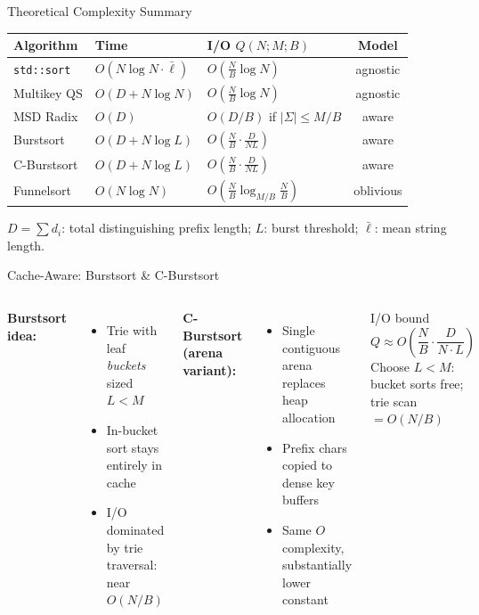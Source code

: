 \documentclass[aspectratio=169]{beamer}
\begin{document}
\begin{frame}{Theoretical Complexity Summary}
  \footnotesize
  \begin{tabular}{@{}lllc@{}}
    \toprule
    Algorithm & Time & I/O $Q(N;M;B)$ & Model \\
    \midrule
    \texttt{std::sort} & $O(N\log N\cdot\bar\ell)$
      & $O\!\left(\tfrac{N}{B}\log N\right)$ & agnostic \\
    Multikey QS & $O(D+N\log N)$
      & $O\!\left(\tfrac{N}{B}\log N\right)$ & agnostic \\
    MSD Radix & $O(D)$
      & $O(D/B)$ if $|\Sigma|\le M/B$ & aware \\
    Burstsort & $O(D+N\log L)$
      & $O\!\left(\tfrac{N}{B}\cdot\tfrac{D}{NL}\right)$ & aware \\
    C-Burstsort & $O(D+N\log L)$
      & $O\!\left(\tfrac{N}{B}\cdot\tfrac{D}{NL}\right)$ & aware \\
    Funnelsort & $O(N\log N)$
      & $O\!\left(\tfrac{N}{B}\log_{M/B}\tfrac{N}{B}\right)$ & oblivious \\
    \bottomrule
  \end{tabular}
  \vspace{0.4em}
  \scriptsize
  $D=\sum d_i$: total distinguishing prefix length;
  $L$: burst threshold;
  $\bar\ell$: mean string length.
\end{frame}

\begin{frame}{Cache-Aware: Burstsort \& C-Burstsort}
  \begin{columns}
      \textbf{Burstsort idea:}
      \begin{itemize}
        \item Trie with leaf \emph{buckets} sized $L < M$
        \item In-bucket sort stays entirely in cache
        \item I/O dominated by trie traversal: near $O(N/B)$
      \end{itemize}
      \vspace{0.5em}
      \textbf{C-Burstsort (arena variant):}
      \begin{itemize}
        \item Single contiguous arena replaces heap allocation
        \item Prefix chars copied to dense key buffers
        \item Same $O$ complexity, substantially lower constant
      \end{itemize}
      \begin{block}{I/O bound}
        \[ Q \approx O\!\left(\frac{N}{B}\cdot\frac{D}{N\cdot L}\right) \]
        Choose $L < M$: bucket sorts free; trie scan $= O(N/B)$
      \end{block}
  \end{columns}
\end{frame}
\end{document}
